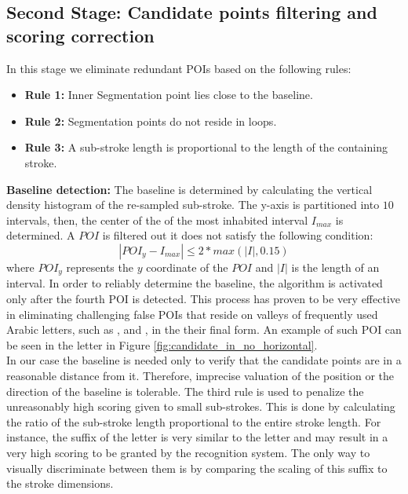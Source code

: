 \documentclass[10pt, conference, compsocconf]{IEEEtran}
\begin{document}
\subsection{Second Stage: Candidate points filtering and scoring correction}
In this stage we eliminate redundant POIs based on the following rules:

\begin{itemize}
	\item[] \textbf{Rule 1:} Inner Segmentation point lies close to the baseline. 
	\item[] \textbf{Rule 2:} Segmentation points do not reside in loops.
	\item[] \textbf{Rule 3:} A sub-stroke length is proportional to the length of the containing stroke.\\
\end{itemize}

\textbf{Baseline detection:} The baseline is determined by calculating the vertical density histogram of the re-sampled sub-stroke. The y-axis is partitioned into $10$ intervals, then, the center of the of the most inhabited interval $I_{max}$ is determined. A $POI$ is filtered out it does not satisfy the following condition:
\begin{equation}
|POI_y-I_{max}| \leq 2*max{({|I|},0.15)} 
\end{equation}
where $POI_y$ represents the $y$ coordinate of the $POI$ and $|I|$ is the length of an interval. In order to reliably determine the baseline, the algorithm is activated only after the fourth POI is detected. This process has proven to be very effective in eliminating challenging false POIs that reside on valleys of frequently used Arabic letters, such as ,  and , in the their final form. An example of such POI can be seen in the letter  in Figure \ref{fig:candidate_in_no_horizontal}. \\

In our case the baseline is needed only to verify that the candidate points are in a reasonable distance from it. Therefore, imprecise valuation of the position or the direction of the baseline is tolerable.
The third rule is used to penalize the unreasonably high scoring given to small sub-strokes. 
This is done by calculating the ratio of the sub-stroke length proportional to the entire stroke length.
For instance, the suffix of the letter  is very similar to the letter  and may result in a very high scoring to be granted by the recognition system. 
The only way to visually discriminate between them is by comparing the scaling of this suffix to the stroke dimensions.\\
\end{document}
